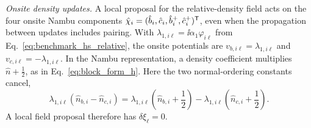 \emph{Onsite density updates.} A local proposal for the relative-density field acts on the four onsite Nambu components $\hat\chi_i=(\hat b_i,\hat c_i,\hat b_i^+,\hat c_i^+)^{\mathsf{T}}$, even when the propagation between updates includes pairing. With $\lambda_{1,i\ell}=\ii\alpha_1\varphi_{i\ell}$ from Eq.~\eqref{eq:benchmark_hs_relative}, the onsite potentials are $v_{b,i\ell}=\lambda_{1,i\ell}$ and $v_{c,i\ell}=-\lambda_{1,i\ell}$. In the Nambu representation, a density coefficient multiplies $\hat n+\frac12$, as in Eq.~\eqref{eq:block_form_h}. Here the two normal-ordering constants cancel,
\begin{equation}
    \lambda_{1,i\ell}(\hat n_{b,i}-\hat n_{c,i})
    =
    \lambda_{1,i\ell}\left(\hat n_{b,i}+\frac12\right)
    -\lambda_{1,i\ell}\left(\hat n_{c,i}+\frac12\right).
    \label{eq:nambu_hs_constant}
\end{equation}
A local field proposal therefore has $\delta\xi_\ell=0$.

